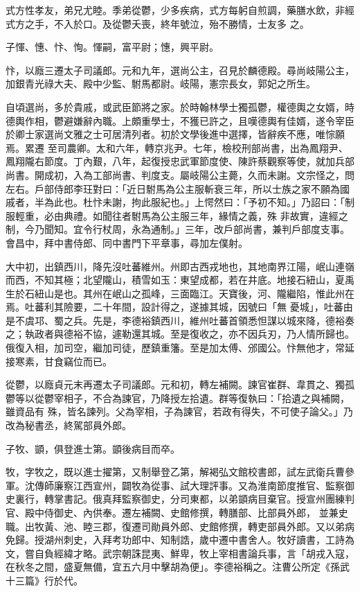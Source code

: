 \begin{pinyinscope}
 式方性孝友，弟兄尤睦。季弟從鬱，少多疾病，式方每躬自煎調，藥膳水飲，非經式方之手，不入於口。及從鬱夭喪，終年號泣，殆不勝情，士友多
 之。



 子惲、憓、忭、恂。惲嗣，富平尉；憓，興平尉。



 忭，以廕三遷太子司議郎。元和九年，選尚公主，召見於麟德殿。尋尚岐陽公主，加銀青光祿大夫、殿中少監、駙馬都尉。岐陽，憲宗長女，郭妃之所生。



 自頃選尚，多於貴戚，或武臣節將之家。於時翰林學士獨孤鬱，權德輿之女婿，時德輿作相，鬱避嫌辭內職。上頗重學士，不獲已許之，且嘆德輿有佳婿，遂令宰臣於卿士家選尚文雅之士可居清列者。初於文學後進中選擇，皆辭疾不應，唯悰願焉。累遷
 至司農卿。太和六年，轉京兆尹。七年，檢校刑部尚書，出為鳳翔尹、鳳翔隴右節度。丁內艱，八年，起復授忠武軍節度使、陳許蔡觀察等使，就加兵部尚書。開成初，入為工部尚書、判度支。屬岐陽公主薨，久而未謝。文宗怪之，問左右。戶部侍郎李玨對曰：「近日駙馬為公主服斬衰三年，所以士族之家不願為國戚者，半為此也。杜忭未謝，拘此服紀也。」上愕然曰：「予初不知。」乃詔曰：「制服輕重，必由典禮。如聞往者駙馬為公主服三年，緣情之義，殊
 非故實，違經之制，今乃聞知。宜令行杖周，永為通制。」三年，改戶部尚書，兼判戶部度支事。會昌中，拜中書侍郎、同中書門下平章事，尋加左僕射。



 大中初，出鎮西川，降先沒吐蕃維州。州即古西戎地也，其地南界江陽，岷山連嶺而西，不知其極；北望隴山，積雪如玉：東望成都，若在井底。地接石紐山，夏禹生於石紐山是也。其州在岷山之孤峰，三面臨江。天寶後，河、隴繼陷，惟此州在焉。吐蕃利其險要，二十年間，設計得之，遂據其城，因號曰「無
 憂城」，吐蕃由是不虞邛、蜀之兵。先是，李德裕鎮西川，維州吐蕃首領悉怛謀以城來降，德裕奏之；執政者與德裕不協，遽勒還其城。至是復收之，亦不因兵刃，乃人情所歸也。俄復入相，加司空，繼加司徒，歷鎮重籓。至是加太傅、邠國公。忭無他才，常延接寒素，甘食竊位而已。



 從鬱，以廕貞元末再遷太子司議郎。元和初，轉左補闕。諫官崔群、韋貫之、獨孤鬱等以從鬱宰相子，不合為諫官，乃降授左拾遺。群等復執曰：「拾遺之與補闕，雖資品有
 殊，皆名諫列。父為宰相，子為諫官，若政有得失，不可使子論父。」乃改為秘書丞，終駕部員外郎。



 子牧、顗，俱登進士第。顗後病目而卒。



 牧，字牧之，既以進士擢第，又制舉登乙第，解褐弘文館校書郎，試左武衛兵曹參軍。沈傳師廉察江西宣州，闢牧為從事、試大理評事。又為淮南節度推官、監察御史裏行，轉掌書記。俄真拜監察御史，分司東都，以弟顗病目棄官。授宣州團練判官、殿中侍御史、內供奉。遷左補闕、史館修撰，轉膳部、比部員外郎，
 並兼史職。出牧黃、池、睦三郡，復遷司勛員外郎、史館修撰，轉吏部員外郎。又以弟病免歸。授湖州刺史，入拜考功郎中、知制誥，歲中遷中書舍人。牧好讀書，工詩為文，嘗自負經緯才略。武宗朝誅昆夷、鮮卑，牧上宰相書論兵事，言「胡戎入寇，在秋冬之間，盛夏無備，宜五六月中擊胡為便」。李德裕稱之。注曹公所定《孫武十三篇》行於代。




\end{pinyinscope}
